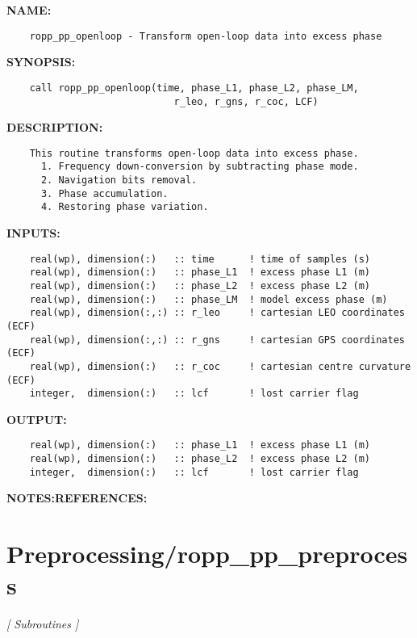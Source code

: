 \label{ch:robo78}
\label{ch:Preprocessing_ropp_pp_openloop}
\textbf{NAME:}\hspace{0.08in}\begin{Verbatim}
    ropp_pp_openloop - Transform open-loop data into excess phase
\end{Verbatim}
\textbf{SYNOPSIS:}\hspace{0.08in}\begin{Verbatim}
    call ropp_pp_openloop(time, phase_L1, phase_L2, phase_LM, 
                             r_leo, r_gns, r_coc, LCF)
\end{Verbatim}
\textbf{DESCRIPTION:}\hspace{0.08in}\begin{Verbatim}
    This routine transforms open-loop data into excess phase.
      1. Frequency down-conversion by subtracting phase mode.
      2. Navigation bits removal.
      3. Phase accumulation.
      4. Restoring phase variation.
\end{Verbatim}
\textbf{INPUTS:}\hspace{0.08in}\begin{Verbatim}
    real(wp), dimension(:)   :: time      ! time of samples (s)
    real(wp), dimension(:)   :: phase_L1  ! excess phase L1 (m)
    real(wp), dimension(:)   :: phase_L2  ! excess phase L2 (m)
    real(wp), dimension(:)   :: phase_LM  ! model excess phase (m)
    real(wp), dimension(:,:) :: r_leo     ! cartesian LEO coordinates (ECF)
    real(wp), dimension(:,:) :: r_gns     ! cartesian GPS coordinates (ECF)
    real(wp), dimension(:)   :: r_coc     ! cartesian centre curvature (ECF)
    integer,  dimension(:)   :: lcf       ! lost carrier flag
\end{Verbatim}
\textbf{OUTPUT:}\hspace{0.08in}\begin{Verbatim}
    real(wp), dimension(:)   :: phase_L1  ! excess phase L1 (m)
    real(wp), dimension(:)   :: phase_L2  ! excess phase L2 (m)
    integer,  dimension(:)   :: lcf       ! lost carrier flag
\end{Verbatim}
\textbf{NOTES:}\hspace{0.08in}\textbf{REFERENCES:}\hspace{0.08in}\section{Preprocessing/ropp\_pp\_preprocess}
\textsl{[ Subroutines ]}

